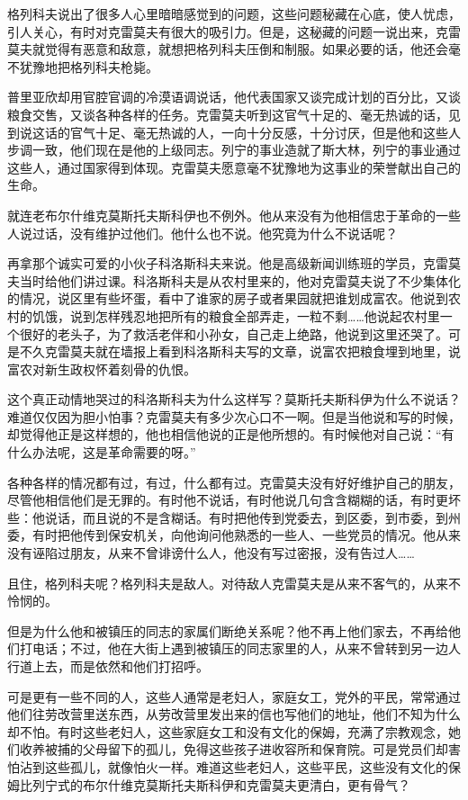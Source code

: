 格列科夫说出了很多人心里暗暗感觉到的问题，这些问题秘藏在心底，使人忧虑，引人关心，有时对克雷莫夫有很大的吸引力。但是，这秘藏的问题一说出来，克雷莫夫就觉得有恶意和敌意，就想把格列科夫压倒和制服。如果必要的话，他还会毫不犹豫地把格列科夫枪毙。

普里亚欣却用官腔官调的冷漠语调说话，他代表国家又谈完成计划的百分比，又谈粮食交售，又谈各种各样的任务。克雷莫夫听到这官气十足的、毫无热诚的话，见到说这话的官气十足、毫无热诚的人，一向十分反感，十分讨厌，但是他和这些人步调一致，他们现在是他的上级同志。列宁的事业造就了斯大林，列宁的事业通过这些人，通过国家得到体现。克雷莫夫愿意毫不犹豫地为这事业的荣誉献出自己的生命。

就连老布尔什维克莫斯托夫斯科伊也不例外。他从来没有为他相信忠于革命的一些人说过话，没有维护过他们。他什么也不说。他究竟为什么不说话呢？

再拿那个诚实可爱的小伙子科洛斯科夫来说。他是高级新闻训练班的学员，克雷莫夫当时给他们讲过课。科洛斯科夫是从农村里来的，他对克雷莫夫说了不少集体化的情况，说区里有些坏蛋，看中了谁家的房子或者果园就把谁划成富农。他说到农村的饥饿，说到怎样残忍地把所有的粮食全部弄走，一粒不剩……他说起农村里一个很好的老头子，为了救活老伴和小孙女，自己走上绝路，他说到这里还哭了。可是不久克雷莫夫就在墙报上看到科洛斯科夫写的文章，说富农把粮食埋到地里，说富农对新生政权怀着刻骨的仇恨。

这个真正动情地哭过的科洛斯科夫为什么这样写？莫斯托夫斯科伊为什么不说话？难道仅仅因为胆小怕事？克雷莫夫有多少次心口不一啊。但是当他说和写的时候，却觉得他正是这样想的，他也相信他说的正是他所想的。有时候他对自己说：“有什么办法呢，这是革命需要的呀。”

各种各样的情况都有过，有过，什么都有过。克雷莫夫没有好好维护自己的朋友，尽管他相信他们是无罪的。有时他不说话，有时他说几句含含糊糊的话，有时更坏些：他说话，而且说的不是含糊话。有时把他传到党委去，到区委，到市委，到州委，有时把他传到保安机关，向他询问他熟悉的一些人、一些党员的情况。他从来没有诬陷过朋友，从来不曾诽谤什么人，他没有写过密报，没有告过人……

且住，格列科夫呢？格列科夫是敌人。对待敌人克雷莫夫是从来不客气的，从来不怜悯的。

但是为什么他和被镇压的同志的家属们断绝关系呢？他不再上他们家去，不再给他们打电话；不过，他在大街上遇到被镇压的同志家里的人，从来不曾转到另一边人行道上去，而是依然和他们打招呼。

可是更有一些不同的人，这些人通常是老妇人，家庭女工，党外的平民，常常通过他们往劳改营里送东西，从劳改营里发出来的信也写他们的地址，他们不知为什么却不怕。有时这些老妇人，这些家庭女工和没有文化的保姆，充满了宗教观念，她们收养被捕的父母留下的孤儿，免得这些孩子进收容所和保育院。可是党员们却害怕沾到这些孤儿，就像怕火一样。难道这些老妇人，这些平民，这些没有文化的保姆比列宁式的布尔什维克莫斯托夫斯科伊和克雷莫夫更清白，更有骨气？

